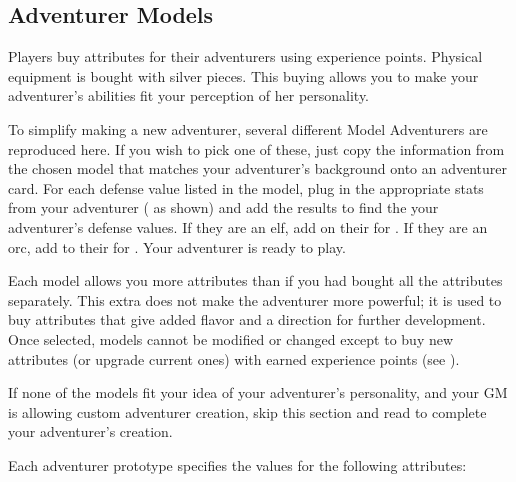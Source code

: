 \begin{multicols*}{2}
\section{Adventurer Models}
Players buy attributes for their adventurers using experience points. Physical equipment is bought with silver pieces. This buying allows you to make your adventurer's abilities fit your perception of her personality.

To simplify making a new adventurer, several different Model Adventurers are reproduced here. If you wish to pick one of these, just copy the information from the chosen model that matches your adventurer's background onto an adventurer card. For each defense value listed in the model, plug in the appropriate stats from your adventurer ( as shown) and add the results to find the your adventurer's defense values. If they are an elf, add  on their \DV for . If they are an orc, add  to their  for . Your adventurer is ready to play.

Each model allows you  more attributes than if you had bought all the attributes separately. This extra does not make the adventurer more powerful; it is used to buy attributes that give added flavor and a direction for further development. Once selected, models cannot be modified or changed except to buy new attributes (or upgrade current ones) with earned experience points (see ).

If none of the models fit your idea of your adventurer's personality, and your GM is allowing custom adventurer creation, skip this section and read to complete your adventurer's creation.

Each adventurer prototype specifies the values for the following attributes:


\end{multicols*}
